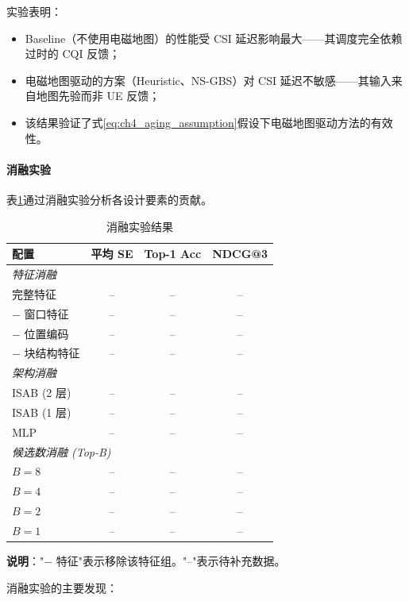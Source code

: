 \documentclass[type=master]{fduthesis}
\begin{document}
实验表明：
\begin{itemize}
\item Baseline（不使用电磁地图）的性能受 CSI 延迟影响最大——其调度完全依赖过时的 CQI 反馈；
\item 电磁地图驱动的方案（Heuristic、NS-GBS）对 CSI 延迟不敏感——其输入来自地图先验而非 UE 反馈；
\item 该结果验证了式\eqref{eq:ch4_aging_assumption}假设下电磁地图驱动方法的有效性。
\end{itemize}

\paragraph{消融实验}
表\ref{tab:ch4_ablation}通过消融实验分析各设计要素的贡献。

\begin{table}[t]
\centering
\caption{消融实验结果}
\label{tab:ch4_ablation}
\begin{tabular}{lccc}
\toprule
\textbf{配置} & \textbf{平均 SE} & \textbf{Top-1 Acc} & \textbf{NDCG@3} \\
\midrule
\multicolumn{4}{l}{\textit{特征消融}} \\
完整特征 & -- & -- & -- \\
$-$ 窗口特征 & -- & -- & -- \\
$-$ 位置编码 & -- & -- & -- \\
$-$ 块结构特征 & -- & -- & -- \\
\midrule
\multicolumn{4}{l}{\textit{架构消融}} \\
ISAB (2 层) & -- & -- & -- \\
ISAB (1 层) & -- & -- & -- \\
MLP & -- & -- & -- \\
\midrule
\multicolumn{4}{l}{\textit{候选数消融 (Top-B)}} \\
$B = 8$ & -- & -- & -- \\
$B = 4$ & -- & -- & -- \\
$B = 2$ & -- & -- & -- \\
$B = 1$ & -- & -- & -- \\
\bottomrule
\end{tabular}
\begin{minipage}{0.95\linewidth}
\footnotesize
\vspace{0.5em}
\noindent\textbf{说明}："$-$ 特征"表示移除该特征组。"--"表示待补充数据。
\end{minipage}
\end{table}

消融实验的主要发现：
\end{document}
